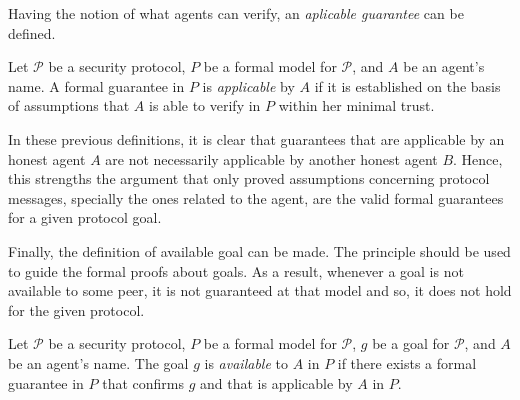 Having the notion of what agents can verify, an \textit{aplicable guarantee} can be defined.

\begin{definition}
  Let \(\mathcal{P}\) be a security protocol, \(P\) be a formal model for \(\mathcal{P}\), and \(A\) be an agent's name. A formal guarantee in \(P\) is \textit{applicable} by \(A\) if it is established on the basis of assumptions that \(A\) is able to verify in \(P\) within her minimal trust.
\end{definition}

In these previous definitions, it is clear that guarantees that are applicable by an honest agent \(A\) are not necessarily applicable by another honest agent \(B\). Hence, this strengths the argument that only proved assumptions concerning protocol messages, specially the ones related to the agent, are the valid formal guarantees for a given protocol goal.

Finally, the definition of available goal can be made. The principle should be used to guide the formal proofs about goals. As a result, whenever a goal is not available to some peer, it is not guaranteed at that model and so, it does not hold for the given protocol.

\begin{definition}
  Let \(\mathcal{P}\) be a security protocol, \(P\) be a formal model for \(\mathcal{P}\), \(g\) be a goal for \(\mathcal{P}\), and \(A\) be an agent's name. The goal \(g\) is \textit{available} to \(A\) in \(P\) if there exists a formal guarantee in \(P\) that confirms \(g\) and that is applicable by \(A\) in \(P\).
\end{definition}
